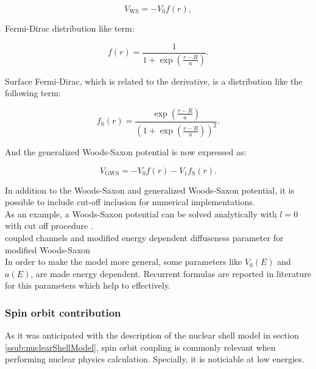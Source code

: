 \documentclass[openany]{book}
\begin{document}
\begin{equation} \label{eq:potential_WoodsSaxon2}
	V_{\mathrm{WS}} = -V_0 f(r),
\end{equation}

Fermi-Dirac distribution like term: 

\begin{equation}  \label{eq:potential_WoodsSaxon2_fermiDirac}
	f(r) = \frac{1}{1 + \exp {\left(\frac{r- R}{a}\right)}}.
\end{equation}

Surface Fermi-Dirac, which is related to the derivative, is a distribution like the following term: 

\begin{equation}  \label{eq:potential_WoodsSaxon2_surfaceFermiDirac}
	f_{\mathrm{S}}(r) = \frac{\exp{\left(\frac{r - R}{a}\right)}}{\left(1 + \exp {\left(\frac{r- R}{a}\right)}\right)^2}.
\end{equation}

And the generalized Woods-Saxon potential is now expressed as: 

\begin{equation} \label{eq:potential_GeneralWoodsSaxon}
	V_{\mathrm{GWS}} = -V_0 f(r) - V_1 	f_{\mathrm{S}}(r).
\end{equation}

In addition to the Woods-Saxon and generalized Woods-Saxon potential, it is possible to include cut-off inclusion for numerical implementations. \\

As an example, a Woods-Saxon potential can be solved analytically with $l = 0$ with cut off procedure \cite{salamon_baran_vertse_2016}. \\

coupled channels and modified energy dependent diffuseness parameter for modified Woods-Saxon \cite{singh_sukhvinder_kharab_2013A} \\


In order to make the model more general, some parameters like $V_0(E)$ and $a(E)$, are made energy dependent. Recurrent formulas are reported in literature for this parameters which help to effectively.

\subsubsection{Spin orbit contribution} \label{sub:potential_effective_spinOrbit}

As it was anticipated with the description of the nuclear shell model in section \ref{ssub:nuclearShellModel}, spin orbit coupling is commonly relevant when performing nuclear physics calculation. Specially, it is noticiable at low energies. \\
\end{document}
